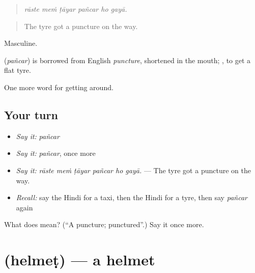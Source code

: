 \begin{quote}
     
\end{quote}

\begin{quote}
\emph{rāste meṁ ṭāyar pañcar ho gayā.}
\end{quote}

\begin{quote}
The tyre got a puncture on the way.
\end{quote}

Masculine.

\begin{cousinweb}
\textbf{} (\emph{pañcar}) is borrowed from English \emph{puncture}, shortened in the mouth;  , to get a flat tyre.
\end{cousinweb}

\begin{grammarlens}[title={What you've built}]
One more word for getting around.
\end{grammarlens}

\subsection*{Your turn}
\begin{itemize}
\raggedright
  \item \emph{Say it:} \emph{pañcar}
  \item \emph{Say it:} \emph{pañcar}, once more
  \item \emph{Say it:} \emph{rāste meṁ ṭāyar pañcar ho gayā.} — The tyre got a puncture on the way.
  \item \emph{Recall:} say the Hindi for a taxi, then the Hindi for a tyre, then say \emph{pañcar} again
\end{itemize}

\begin{tcolorbox}[breakable,colback=teal!4,colframe=teal!35!black,title={Before you move on}]
What does  mean? (\textquotedblleft{}A puncture; punctured\textquotedblright{}.) Say it once more.
\end{tcolorbox}
\section[\texorpdfstring{\hi{हेलमेट} (helmeṭ)}{हेलमेट (helmeṭ)}]{ (helmeṭ) — a helmet}

\label{lesson:HI-C406-helmet}




